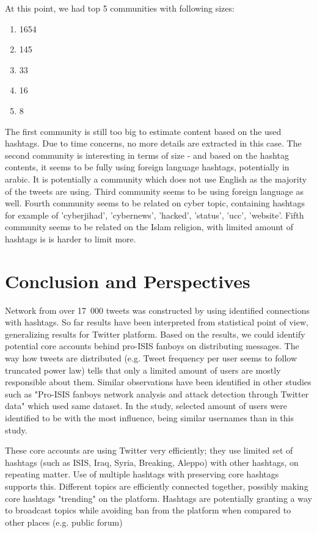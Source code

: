 \documentclass[conference]{IEEEtran}
\begin{document}
    At this point, we had top 5 communities with following sizes:

    \begin{enumerate}
        \item 1654
        \item 145
        \item 33
        \item 16
        \item 8
    \end{enumerate}

    The first community is still too big to estimate content based on the used hashtags.
    Due to time concerns, no more details are extracted in this case.
    The second community is interesting in terms of size  - and based on the hashtag contents, it seems to be fully using foreign language hashtags,
    potentially in arabic.
    It is potentially a community which does not use English as the majority of the tweets are using.
    Third community seems to be using foreign language as well.
    Fourth community seems to be related on cyber topic, containing hashtags for example of 'cyberjihad', 'cybernews', 'hacked', 'status', 'ucc', 'website'.
    Fifth community seems to be related on the Islam religion, with limited amount of hashtags is is harder to limit more.


    \section{Conclusion and Perspectives}\label{sec:conclusion-and-perspectives}

    Network from over 17~000 tweets was constructed by using identified connections with hashtags.
    So far results have been interpreted from statistical point of view, generalizing results for Twitter platform.
    Based on the results, we could identify potential core accounts behind pro-ISIS fanboys on distributing messages.
    The way how tweets are distributed (e.g. Tweet frequency per user seems to follow truncated power law)
    tells that only a limited amount of users are mostly responsible about them.
    Similar observations have been identified in other studies such as "Pro-ISIS fanboys network analysis and attack detection through Twitter data"\cite{8078846} which used same dataset.
    In the study, selected amount of users were identified to be with the most influence, being similar usernames than in this study.

    These core accounts are using Twitter very efficiently; they use limited set of hashtags (such as ISIS, Iraq, Syria, Breaking, Aleppo) with other hashtags, on repeating matter.
    Use of multiple hashtags with preserving core hashtags supports this.
    Different topics are efficiently connected together, possibly making core hashtags "trending" on the platform.
    Hashtags are potentially granting a way to broadcast topics while avoiding ban from the platform when compared to other places (e.g. public forum)
\end{document}
